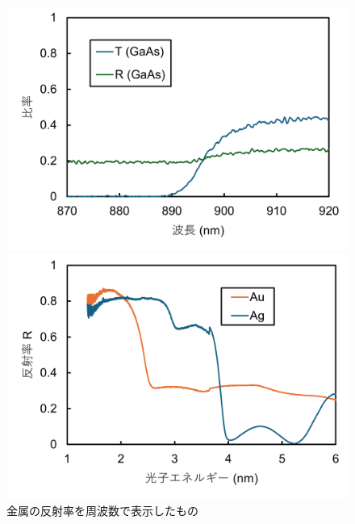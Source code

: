 \documentclass[11pt,dvipdfmx,a4paper]{jsarticle}
\begin{document}
\begin{figure}[H]
\begin{minipage}[t]{0.48\columnwidth}
        \centering
        \includegraphics[width = \columnwidth]{graph/graphC.png}
        \caption{}
    \end{minipage}
    \hfil
    \begin{minipage}[t]{0.48\columnwidth}
        \centering
        \includegraphics[width = \columnwidth]{graph/graphD.png}
        \caption{金属の反射率を周波数で表示したもの}
    \end{minipage}
\end{figure}
\end{document}
